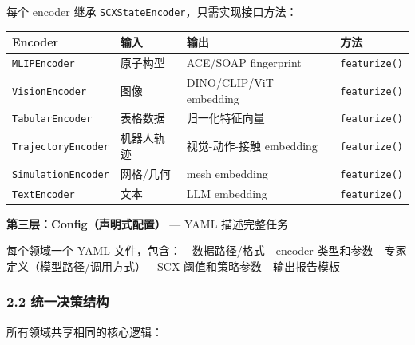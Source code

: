 \documentclass[
  12pt,
]{ctexart}
\begin{document}
每个 encoder 继承 \texttt{SCXStateEncoder}，只需实现接口方法：

\begin{longtable}[]{@{}
  >{\raggedright\arraybackslash}p{}
  >{\raggedright\arraybackslash}p{}
  >{\raggedright\arraybackslash}p{}
  >{\raggedright\arraybackslash}p{}@{}}
\toprule\noalign{}
\begin{minipage}[b]{\linewidth}\raggedright
Encoder
\end{minipage} & \begin{minipage}[b]{\linewidth}\raggedright
输入
\end{minipage} & \begin{minipage}[b]{\linewidth}\raggedright
输出
\end{minipage} & \begin{minipage}[b]{\linewidth}\raggedright
方法
\end{minipage} \\
\midrule\noalign{}
\endhead
\bottomrule\noalign{}
\endlastfoot
\texttt{MLIPEncoder} & 原子构型 & ACE/SOAP fingerprint &
\texttt{featurize()} \\
\texttt{VisionEncoder} & 图像 & DINO/CLIP/ViT embedding &
\texttt{featurize()} \\
\texttt{TabularEncoder} & 表格数据 & 归一化特征向量 &
\texttt{featurize()} \\
\texttt{TrajectoryEncoder} & 机器人轨迹 & 视觉-动作-接触 embedding &
\texttt{featurize()} \\
\texttt{SimulationEncoder} & 网格/几何 & mesh embedding &
\texttt{featurize()} \\
\texttt{TextEncoder} & 文本 & LLM embedding & \texttt{featurize()} \\
\end{longtable}

\textbf{第三层：Config（声明式配置）} --- YAML 描述完整任务

每个领域一个 YAML 文件，包含： - 数据路径/格式 - encoder 类型和参数 -
专家定义（模型路径/调用方式） - SCX 阈值和策略参数 - 输出报告模板

\subsubsection{2.2
统一决策结构}\label{ux7edfux4e00ux51b3ux7b56ux7ed3ux6784}

所有领域共享相同的核心逻辑：
\end{document}
